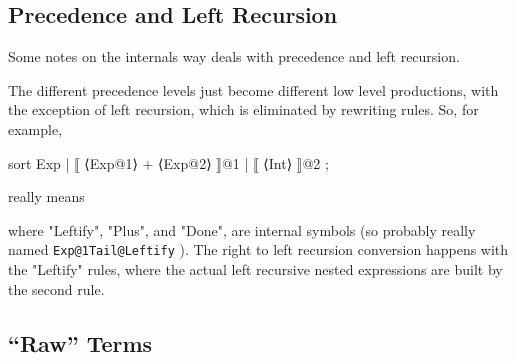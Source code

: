 \documentclass[11pt]{article} %
\begin{document}
\subsection{Precedence and Left Recursion}
\label{app:prec}

Some notes on the internals way \HAX deals with precedence and left recursion.

\begin{remark}
  The different precedence levels just become different low level productions, with the exception of
  left recursion, which is eliminated by rewriting rules. So, for example,
\begin{code}
sort Exp | ⟦ ⟨Exp@1⟩ + ⟨Exp@2⟩ ⟧@1 | ⟦ ⟨Int⟩ ⟧@2 ;
\end{code}
  really means
  where "Leftify", "Plus", and "Done", are internal symbols (so probably really named
  \verb"Exp@1Tail@Leftify" \etc). The right to left recursion conversion happens with the "Leftify"
  rules, where the actual left recursive nested expressions are built by the second rule.
\end{remark}

\subsection{``Raw'' Terms}
\end{document}
